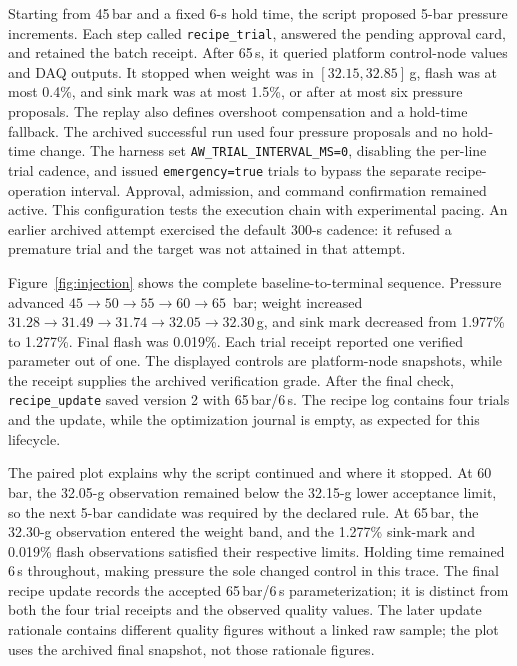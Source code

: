 Starting from 45\,bar and a fixed 6-s hold time, the script proposed
5-bar pressure increments. Each step called \texttt{recipe\_trial}, answered
the pending approval card, and retained the batch receipt. After 65\,s,
it queried platform control-node values and DAQ outputs. It stopped when
weight was in $[32.15,32.85]$\,g, flash was at most 0.4\%, and sink mark was
at most 1.5\%, or after at most six pressure proposals. The replay also
defines overshoot compensation and a hold-time fallback. The archived
successful run used four pressure proposals and no hold-time change.
The harness set \texttt{AW\_TRIAL\_INTERVAL\_MS=0}, disabling the per-line
trial cadence, and issued \texttt{emergency=true} trials to bypass the
separate recipe-operation interval. Approval, admission, and command
confirmation remained active. This configuration tests the execution chain
with experimental pacing.
An earlier archived attempt exercised the default 300-s cadence: it
refused a premature trial and the target was not attained in that attempt.

Figure~\ref{fig:injection} shows the complete baseline-to-terminal sequence.
Pressure advanced $45\rightarrow50\rightarrow55\rightarrow60\rightarrow65$
\,bar; weight increased
$31.28\rightarrow31.49\rightarrow31.74\rightarrow32.05\rightarrow32.30$\,g,
and sink mark decreased from 1.977\% to 1.277\%. Final flash was 0.019\%.
Each trial receipt reported one verified parameter out of one.
The displayed controls are platform-node snapshots, while the receipt
supplies the archived verification grade. After the final check,
\texttt{recipe\_update} saved version 2 with 65\,bar/6\,s. The recipe log
contains four trials and the update, while the optimization journal is empty,
as expected for this lifecycle.

The paired plot explains why the script continued and where it stopped.
At 60\,bar, the 32.05-g observation remained below the 32.15-g lower
acceptance limit, so the next 5-bar candidate was required by the declared
rule. At 65\,bar, the 32.30-g observation entered the weight band, and the
1.277\% sink-mark and 0.019\% flash observations satisfied their respective
limits. Holding time remained 6\,s throughout, making pressure the sole
changed control in this trace. The final recipe update records the accepted
65\,bar/6\,s parameterization; it is distinct from both the four trial
receipts and the observed quality values. The later update rationale contains
different quality figures without a linked raw sample; the plot uses the
archived final snapshot, not those rationale figures.

